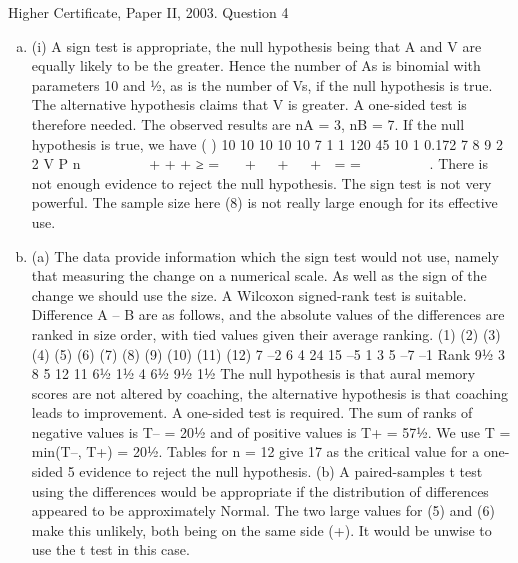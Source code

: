 \documentclass[a4paper,12pt]{article}
\begin{document}
Higher Certificate, Paper II, 2003. Question 4
\begin{enumerate}[(a)]
\item (i) A sign test is appropriate, the null hypothesis being that A and V are equally
likely to be the greater. Hence the number of As is binomial with parameters
10 and ½, as is the number of Vs, if the null hypothesis is true. The alternative
hypothesis claims that V is greater. A one-sided test is therefore needed.
The observed results are nA = 3, nB = 7.
If the null hypothesis is true, we have
( ) 10 10
10 10 10 7 1 1 120 45 10 1 0.172
7 8 9 2 2 V P n
       + + + ≥ =   +   +   +  = =
      
.
There is not enough evidence to reject the null hypothesis.
The sign test is not very powerful. The sample size here (8) is not really large
enough for its effective use.
\item  (a) The data provide information which the sign test would not use,
namely that measuring the change on a numerical scale. As well as the
sign of the change we should use the size. A Wilcoxon signed-rank
test is suitable. Difference A – B are as follows, and the absolute
values of the differences are ranked in size order, with tied values
given their average ranking.
(1) (2) (3) (4) (5) (6) (7) (8) (9) (10) (11) (12)
7 –2 6 4 24 15 –5 1 3 5 –7 –1
Rank 9½ 3 8 5 12 11 6½ 1½ 4 6½ 9½ 1½
The null hypothesis is that aural memory scores are not altered by
coaching, the alternative hypothesis is that coaching leads to
improvement. A one-sided test is required.
The sum of ranks of negative values is T– = 20½ and of positive values
is T+ = 57½. We use T = min(T–, T+) = 20½. Tables for n = 12 give 17
as the critical value for a one-sided 5%
evidence to reject the null hypothesis.
(b) A paired-samples t test using the differences would be appropriate if
the distribution of differences appeared to be approximately Normal.
The two large values for (5) and (6) make this unlikely, both being on
the same side (+). It would be unwise to use the t test in this case.
\end{enumerate}
\end{document}
